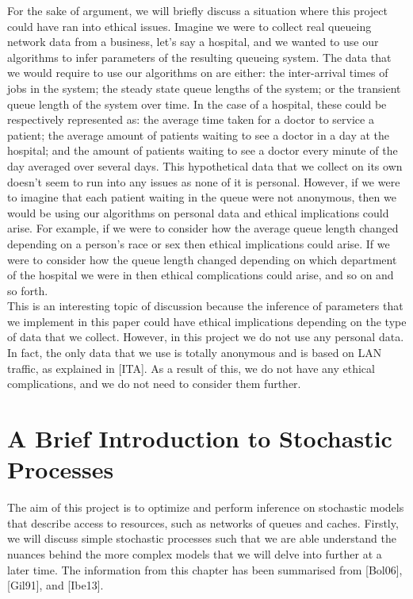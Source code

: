 \documentclass[a4paper,11pt,titlepage]{article}
\begin{document}
For the sake of argument, we will briefly discuss a situation where this project could have ran into ethical issues. Imagine we were to collect real queueing network data from a business, let's say a hospital, and we wanted to use our algorithms to infer parameters of the resulting queueing system. The data that we would require to use our algorithms on are either: the inter-arrival times of jobs in the system; the steady state queue lengths of the system; or the transient queue length of the system over time. In the case of a hospital, these could be respectively represented as: the average time taken for a doctor to service a patient; the average amount of patients waiting to see a doctor in a day at the hospital; and the amount of patients waiting to see a doctor every minute of the day averaged over several days. This hypothetical data that we collect on its own doesn't seem to run into any issues as none of it is personal. However, if we were to imagine that each patient waiting in the queue were not anonymous, then we would be using our algorithms on personal data and ethical implications could arise. For example, if we were to consider how the average queue length changed depending on a person's race or sex then ethical implications could arise. If we were to consider how the queue length changed depending on which department of the hospital we were in then ethical complications could arise, and so on and so forth. \\

This is an interesting topic of discussion because the inference of parameters that we implement in this paper could have ethical implications depending on the type of data that we collect. However, in this project we do not use any personal data. In fact, the only data that we use is totally anonymous and is based on LAN traffic, as explained in [ITA]. As a result of this, we do not have any ethical complications, and we do not need to consider them further. 

\section{A Brief Introduction to Stochastic Processes}

The aim of this project is to optimize and perform inference on stochastic models that describe access to resources, such as networks of queues and caches. Firstly, we will discuss simple stochastic processes such that we are able understand the nuances behind the more complex models that we will delve into further at a later time. The information from this chapter has been summarised from [Bol06], [Gil91], and [Ibe13].\\
\end{document}
